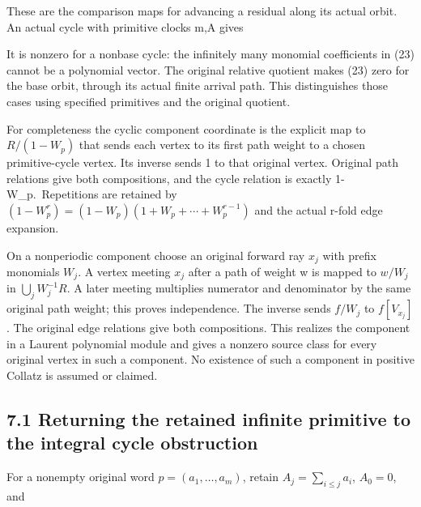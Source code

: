 
These are the comparison maps for advancing a residual along its actual
orbit. An actual cycle with primitive clocks m,A gives


It is nonzero for a nonbase cycle: the infinitely many monomial
coefficients in (23) cannot be a polynomial vector. The original
relative quotient makes (23) zero for the base orbit, through its actual
finite arrival path. This distinguishes those cases using specified
primitives and the original quotient.

For completeness the cyclic component coordinate is the explicit map to
\(R/(1-W_p)\) that sends each vertex to its first path weight to a
chosen primitive-cycle vertex. Its inverse sends 1 to that original
vertex. Original path relations give both compositions, and the cycle
relation is exactly 1-W\_p.~Repetitions are retained by
\((1-W_p^r)=(1-W_p)(1+W_p+\cdots+W_p^{r-1})\) and the actual r-fold edge
expansion.

On a nonperiodic component choose an original forward ray \(x_j\) with
prefix monomials \(W_j\). A vertex meeting \(x_j\) after a path of
weight w is mapped to \(w/W_j\) in \(\bigcup_j W_j^{-1}R\). A later
meeting multiplies numerator and denominator by the same original path
weight; this proves independence. The inverse sends \(f/W_j\) to
\(f[V_{x_j}]\). The original edge relations give both compositions. This
realizes the component in a Laurent polynomial module and gives a
nonzero source class for every original vertex in such a component. No
existence of such a component in positive Collatz is assumed or claimed.

\subsection{7.1 Returning the retained infinite primitive to the
integral cycle obstruction}

For a nonempty original word \(p=(a_1,\ldots,a_m)\), retain
\(A_j=\sum_{i\le j}a_i\), \(A_0=0\), and


